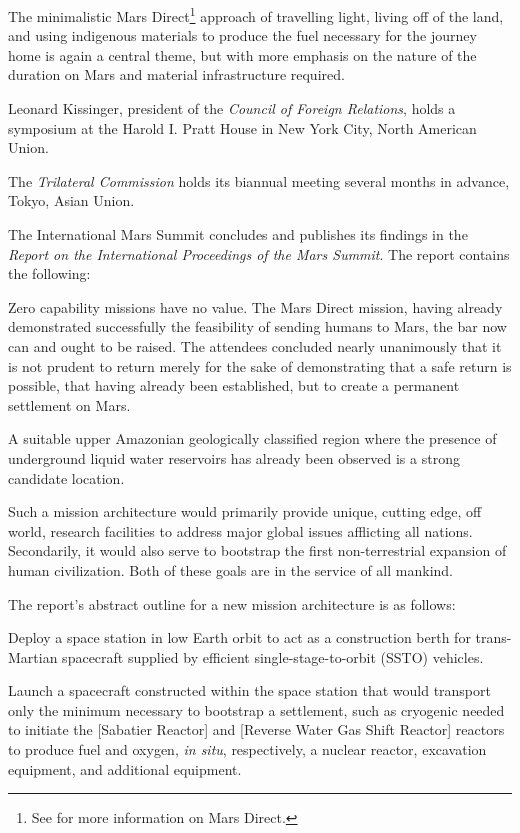 The minimalistic Mars Direct\footnote{See  for more information on Mars Direct.} approach of travelling light, living off of the land, and using indigenous materials to produce the fuel necessary for the journey home is again a central theme, but with more emphasis on the nature of the duration on Mars and material infrastructure required.
\StopTimelineDate

Leonard Kissinger, president of the {\it Council of Foreign Relations}, holds a symposium at the Harold I. Pratt House in New York City, North American Union.
\StopTimelineDate

The {\it Trilateral Commission} holds its biannual meeting several months in advance, Tokyo, Asian Union.
\StopTimelineDate

The International Mars Summit concludes and publishes its findings in the {\it Report on the International Proceedings of the Mars Summit}. The report contains the following:
\crlf

\startTimelineDocument
Zero capability missions have no value. The Mars Direct mission, having already demonstrated successfully the feasibility of sending humans to Mars, the bar now can and ought to be raised. The attendees concluded nearly unanimously that it is not prudent to return merely for the sake of demonstrating that a safe return is possible, that having already been established, but to create a permanent settlement on Mars. 

A suitable upper Amazonian geologically classified region where the presence of underground liquid water reservoirs has already been observed is a strong candidate location. 

Such a mission architecture would primarily provide unique, cutting edge, off world, research facilities to address major global issues afflicting all nations. Secondarily, it would also serve to bootstrap the first non-terrestrial expansion of human civilization. Both of these goals are in the service of all mankind.
\stopTimelineDocument
\crlf

The report's abstract outline for a new mission architecture is as follows:

\startitemize[n]
\item Deploy a space station in low Earth orbit to act as a construction berth for trans-Martian spacecraft supplied by efficient single-stage-to-orbit (SSTO) vehicles.

\item Launch a spacecraft constructed within the space station that would transport only the minimum necessary to bootstrap a settlement, such as cryogenic  needed to initiate the [Sabatier Reactor] and [Reverse Water Gas Shift Reactor] reactors to produce fuel and oxygen, {\it in situ}, respectively, a nuclear reactor, excavation equipment, and additional equipment.

